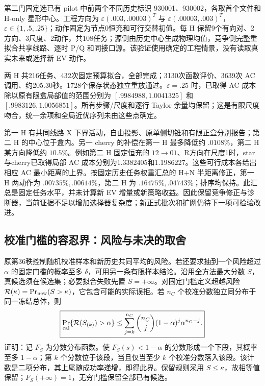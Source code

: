 \documentclass[UTF8,fontset=fandol,11pt,a4paper]{ctexart}
\begin{document}
第二门固定选已有 pilot 中前两个不同历史标识 930001、930002，各取首个文件和 H-only 星形中心。工程方向为 $\varepsilon(.003,.00003)^T$ 与 $\varepsilon(.00003,.003)^T$，$\varepsilon\in\{1,.5,.25\}$；动作固定为节点0恒充和可行交替初值。每 H 保留9个有向对、2方向、3尺度、2动作，共108任务；源侧由历史中心生成物理均值，竞争侧完整重拟合共享线路、逐时 P/Q 和同接口源。该验证使用确定的工程情景，没有读取真实未来或选择新 EV 动作。

两 H 共216任务、432次固定预算拟合，全部完成；3130次函数评价、3639次 AC 调用、约205.30秒。1728个保存状态独立重放通过。$\varepsilon=.25$ 时，已取得 AC 成本除以原有限盒局部值的范围分别为 $[.9984988,1.0041325]$ 和 $[.9983126,1.0056851]$。所有步骤/尺度和逐行 Taylor 余量均保留；这是有限尺度吻合，统一余项和全局近优序列未由这些点确定。

第一 H 有共同线路 X 下界活动，自由投影、原单侧切锥和有限正盒分别报告；第二 H 的中心位于盒内。另一 cherry 的补偿在第一 H 最多降低约 $.0108\%$，第二 H 某方向降低约 $10.5\%$。例如第二 H 固定恒充的 $12\to01$、R方向在尺度1时，star与cherry已取得局部 AC 成本分别为1.3382405和1.1986227。这些可行成本各给出相应 AC 最小距离的上界。按固定历史任务权重汇总的 H+N 半距离修正，第一 H 两动作为 $.00735\%,.00614\%$，第二 H 为 $.16475\%,.04743\%$；排序均保持。此汇总是固定任务水平，并未计算新 EV 增量或新策略收益。因此保留竞争修正与诊断器，当前证据不足以增加选择器复杂度；新正式批次和扩网仍待下一项可检验改进。

\subsection{校准门槛的容忍界：风险与未决的取舍}
\label{si:tolerance-check}
原第36秩控制随机校准样本和新历史共同平均的风险。若还要求抽到一个风险超过 $\alpha$ 的固定门槛的概率至多 $\delta$，可用另一条有限样本结论。沿用全方法最大分数 $S$，真候选须在候选集；必要拟合失败先置 $S=+\infty$。对固定门槛定义超越风险 $\mathcal R(\kappa)=\Pr_{\rm new}(S>\kappa)$，它包含可能的实际误拒。若 $n_C$ 个校准分数独立同分布于同一冻结总体，则
\begin{equation}
 \boxed{\Pr_{\rm cal}\{\mathcal R(S_{(k)})>\alpha\}
 \le\sum_{j=k}^{n_C}\binom{n_C}{j}(1-\alpha)^j\alpha^{n_C-j}.}
 \label{si:tolerance-bound}
\end{equation}
证明：记 $F_S$ 为分数分布函数。使 $F_S(s)<1-\alpha$ 的分数形成一个下段，其概率至多 $1-\alpha$；第 $k$ 个分数位于该段，当且仅当至少 $k$ 个校准分数落入该段。该计数是二项分布，其上尾随成功率递增，即得此界。保留规则采用 $S\le\kappa$，故相等值保留；$F_S(+\infty)=1$，无穷门槛保留全部已有候选。
\end{document}
